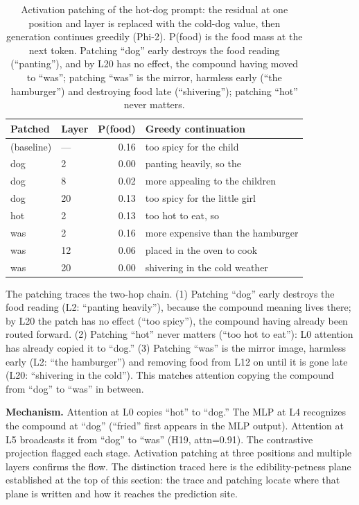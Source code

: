 \documentclass[11pt]{article}
\begin{document}
\begin{table}[htbp]
\centering
\small
\begin{tabularx}{\columnwidth}{@{}llrY@{}}
\toprule
Patched & Layer & P(food) & Greedy continuation \\
\midrule
(baseline) & ---  & 0.16 & too spicy for the child \\
dog        & 2    & 0.00 & panting heavily, so the \\
dog        & 8    & 0.02 & more appealing to the children \\
dog        & 20   & 0.13 & too spicy for the little girl \\
hot        & 2    & 0.13 & too hot to eat, so \\
was        & 2    & 0.16 & more expensive than the hamburger \\
was        & 12   & 0.06 & placed in the oven to cook \\
was        & 20   & 0.00 & shivering in the cold weather \\
\bottomrule
\end{tabularx}
\caption{Activation patching of the hot-dog prompt: the residual at one position
and layer is replaced with the cold-dog value, then generation continues
greedily (Phi-2). P(food) is the food mass at the next token. Patching ``dog''
early destroys the food reading (``panting''), and by L20 has no effect, the
compound having moved to ``was''; patching ``was'' is the mirror, harmless early
(``the hamburger'') and destroying food late (``shivering''); patching ``hot''
never matters.}
\label{tab:hotdog-patch}
\end{table}

The patching traces the two-hop chain. (1) Patching ``dog'' early destroys the
food reading (L2: ``panting heavily''), because the compound meaning lives
there; by L20 the patch has no effect (``too spicy''), the compound having
already been routed forward. (2) Patching ``hot'' never matters (``too hot to
eat''): L0 attention has already copied it to ``dog.'' (3) Patching ``was'' is
the mirror image, harmless early (L2: ``the hamburger'') and removing food from
L12 on until it is gone late (L20: ``shivering in the cold''). This matches
attention copying the compound from ``dog'' to ``was'' in between.

\textbf{Mechanism.} Attention at L0 copies ``hot'' to ``dog.'' The MLP at L4
recognizes the compound at ``dog'' (``fried'' first appears in the MLP output).
Attention at L5 broadcasts it from ``dog'' to ``was'' (H19, attn=0.91). The
contrastive projection flagged each stage. Activation patching at three
positions and multiple layers confirms the flow. The distinction traced here is
the edibility-petness plane established at the top of this section: the trace and
patching locate where that plane is written and how it reaches the prediction
site.
\end{document}
